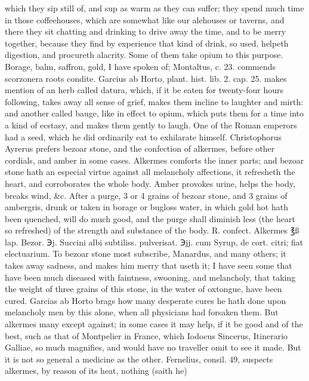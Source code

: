 which they sip still of, and sup as warm as they can suffer; they spend
much time in those coffeehouses, which are somewhat like our alehouses
or taverns, and there they sit chatting and drinking to drive away the
time, and to be merry together, because they find by experience that
kind of drink, so used, helpeth digestion, and procureth alacrity. Some
of them take opium to this purpose.
Borage, balm, saffron, gold, I have spoken of; Montaltus, c. 23.
commends scorzonera roots condite. Garcius ab Horto, plant. hist. lib.
2. cap. 25. makes mention of an herb called datura, which, if it
be eaten for twenty-four hours following, takes away all sense of
grief, makes them incline to laughter and mirth: and another called
bauge, like in effect to opium, which puts them for a time into a kind
of ecstasy, and makes them gently to laugh. One of the Roman emperors
had a seed, which he did ordinarily eat to exhilarate himself.
Christophorus Ayrerus prefers bezoar stone, and the confection of
alkermes, before other cordials, and amber in some cases.
Alkermes comforts the inner parts; and bezoar stone hath an
especial virtue against all melancholy affections, it refresheth
the heart, and corroborates the whole body. Amber provokes urine,
helps the body, breaks wind, \&c. After a purge, 3 or 4 grains of bezoar
stone, and 3 grains of ambergris, drunk or taken in borage or bugloss
water, in which gold hot hath been quenched, will do much good, and the
purge shall diminish less (the heart so refreshed) of the strength and
substance of the body.
℞. confect. Alkermes ℥ß lap. Bezor. ℈j. Succini albi subtiliss.
pulverisat. ℈jj. cum Syrup, de cort. citri; fiat electuarium.
To bezoar stone most subscribe, Manardus, and many others; it
takes away sadness, and makes him merry that useth it; I have seen some
that have been much diseased with faintness, swooning, and melancholy,
that taking the weight of three grains of this stone, in the water of
oxtongue, have been cured. Garcias ab Horto brags how many desperate
cures he hath done upon melancholy men by this alone, when all
physicians had forsaken them. But alkermes many except against; in some
cases it may help, if it be good and of the best, such as that of
Montpelier in France, which Iodocus Sincerus, Itinerario Galliae,
so much magnifies, and would have no traveller omit to see it made. But
it is not so general a medicine as the other. Fernelius, consil. 49,
suspects alkermes, by reason of its heat, nothing (saith he)
